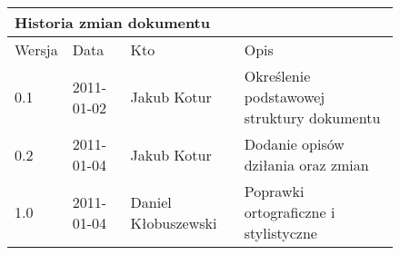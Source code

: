 \begin{figure}[h]
	\centering

\begin{tabular}{|p{}|p{}|p{}|p{}|}
	\hline
	\multicolumn{4}{|l|}{Historia zmian dokumentu} \\
	\hline
	Wersja & Data & Kto & Opis \\
	\hline
	0.1 & 2011-01-02 & Jakub Kotur &
	Określenie podstawowej struktury dokumentu \\
	\hline
	0.2 & 2011-01-04 & Jakub Kotur &
	Dodanie opisów dziłania oraz zmian \\
	\hline
	1.0 & 2011-01-04 & Daniel Kłobuszewski &
	Poprawki ortograficzne i stylistyczne \\
	\hline
\end{tabular}

	\label{tab:hist}
\end{figure}

